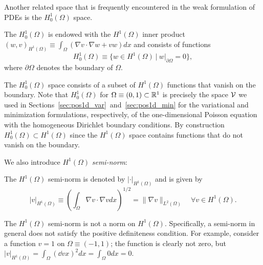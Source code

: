 Another related space that is frequently encountered in the weak formulation of PDEs is the $H^1_0(\Omega)$ space.
\begin{definition} The $H^1_0(\Omega)$ is endowed with the $H^1(\Omega)$ inner product $(w,v)_{H^1(\Omega)} \equiv \int_\Omega (\nabla v \cdot \nabla w + v w) dx$ and consists of functions
\begin{equation*}
  H^1_0(\Omega) \equiv \{ w \in H^1(\Omega) \ | \ w|_{\partial \Omega} = 0 \},
\end{equation*}
where $\partial \Omega$ denotes the boundary of $\Omega$.
\end{definition}
The $H^1_0(\Omega)$ space consists of a subset of $H^1(\Omega)$ functions that vanish on the boundary.  Note that $H^1_0(\Omega)$ for $\Omega \equiv (0,1) \subset \mathbb{R}^1$ is precisely the space $\mathcal{V}$ we used in Sections~\eqref{sec:pos1d_var}~and~\eqref{sec:pos1d_min} for the variational and minimization formulations, respectively, of the one-dimensional Poisson equation with the homogeneous Dirichlet boundary conditions.  By construction $H^1_0(\Omega) \subset H^1(\Omega)$ since the $H^1(\Omega)$ space contains functions that do not vanish on the boundary.

We also introduce $H^1(\Omega)$ \emph{semi-norm}:
\begin{definition}
  The $H^1(\Omega)$ semi-norm is denoted by $| \cdot |_{H^1(\Omega)}$ and is given by
  \begin{equation*}
    | v |_{H^1(\Omega)} \equiv \left(\int_{\Omega} \nabla v \cdot \nabla v dx \right)^{1/2} = \| \nabla v \|_{L^2(\Omega)}   \quad \forall v \in H^1(\Omega).
  \end{equation*}  
\end{definition}
  The $H^1(\Omega)$ semi-norm is not a norm on $H^1(\Omega)$.  Specifically, a semi-norm in general does not satisfy the positive definiteness condition.  For example, consider a function $v = 1$ on $\Omega \equiv (-1,1)$; the function is clearly not zero, but $|v|_{H^1(\Omega)} = \int_\Omega (\dd{v}{x})^2 dx = \int_\Omega 0 dx = 0$.

